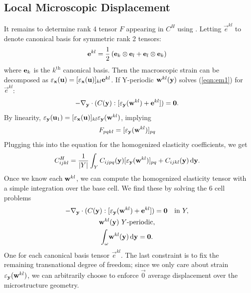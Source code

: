\documentclass[twocolumn,10pt]{article}
\begin{document}
\subsection{Local Microscopic Displacement}
It remains to determine rank 4 tensor $F$ appearing in $C^H$ using
. Letting $\vec{e}^{kl}$ to denote canonical basis for
symmetric rank 2 tensors:
\[
\vec{e}^{kl} = \frac{1}{2} \left({\bf e}_k \otimes {\bf e}_l + {\bf
  e}_l \otimes {\bf e}_k \right)
\]
where ${\bf e}_k$ is the $k^\text{th}$ canonical basis. Then the
macroscopic strain can be decomposed as $\strain_{\x}({\bf u}) =
[\strain_{\x}({\bf u})]_{kl}\vec{e}^{kl}$. If Y-periodic ${\bf
  w}^{kl}({\y})$ solves (\ref{eqn:em1}) for $\vec{e}^{kl}$:
\begin{equation}
-\nabla_{\y} \cdot (C(\y): [\strain_\y({\bf w}^{kl}) +
  \vec{e}^{kl}]) = \vec{0}.
\end{equation}
By linearity, $\strain_\y(\u_1) =
[\strain_\x(\u)]_{kl}\strain_\y(\vec{w}^{kl})$, implying
\begin{equation}
F_{pqkl} = [\strain_{\y}({\bf w}^{kl})]_{pq}
\end{equation}
Plugging this into the equation for the homogenized elasticity
coefficients, we get
\begin{equation}
    \label{eqn:Eh}
    C^H_{ijkl}= \frac{1}{|Y|} \int_Y C_{ijpq}({\y}) [\strain_{\y}({\bf
        w}^{kl})]_{pq} + C_{ijkl}({\y}) \, \mathrm{d} {\y}.
\end{equation}
Once we know each ${\bf w}^{kl}$, we can compute the homogenized
elasticity tensor with a simple integration over the base cell. We
find these by solving the 6 cell problems
\begin{subequations}
  \begin{gather}
    -\nabla_{\y} \cdot (C(\y):[\strain_\y(\vec{w}^{kl}) + \vec{e}^{kl}]) = \vec{0} \quad \text{in } Y, \\
    \vec{w}^{kl}(\y)\ Y \text{-periodic}, \\
    \int_\omega \! \vec{w}^{kl}(\y) \, \mathrm{d} {\y} =  \vec{0}.
  \end{gather}
\end{subequations}
One for each canonical basis tensor $\vec{e}^{kl}$. The last
constraint is to fix the remaining transnational degree of freedom;
since we only care about strain $\strain_{\y}({\bf w}^{kl})$, we can
arbitrarily choose to enforce $\vec{0}$ average displacement over the
microstructure geometry.



\end{document}
